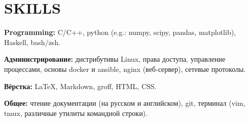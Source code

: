 \section{SKILLS}

\begin{description}

    \setlength\itemsep{-0.4em}

    \item{\bfseries Programming:}
    C/C++, python (e.g.: numpy, scipy, pandas, matplotlib), Haskell, bash/zsh.

    \item{\bfseries Администрирование:}
    дистрибутивы Linux, права доступа, управление процессами, основы docker и ansible, nginx (веб-сервер),
    сетевые протоколы.
    
    \item{\bfseries Вёрстка:}
    \LaTeX, Markdown, groff, HTML, CSS.

    \item{\bfseries Общее:}
    чтение документации (на русском и английском), git, терминал (vim, tmux, различные утилиты командной строки).

\end{description}
    
    \vspace{.7em}
